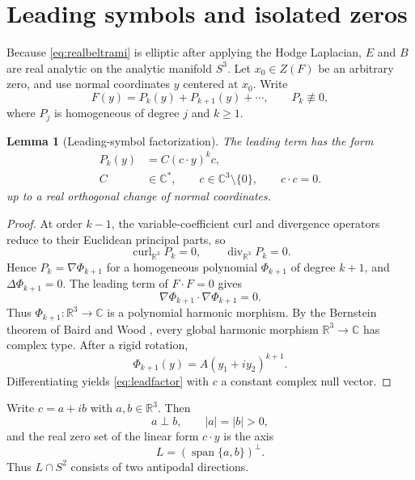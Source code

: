 \documentclass[aps,prd,reprint,nofootinbib,superscriptaddress]{revtex4-2}
\newtheorem{lemma}[theorem]{Lemma}
\theoremstyle{definition}
\theoremstyle{remark}
\newcommand{\R}{\mathbb{R}}
\newcommand{\C}{\mathbb{C}}
\newcommand{\Div}{\operatorname{div}}
\newcommand{\Curl}{\operatorname{curl}}
\newcommand{\Span}{\operatorname{span}}
\begin{document}
\section{Leading symbols and isolated zeros}

Because \eqref{eq:realbeltrami} is elliptic after applying the Hodge Laplacian, $E$ and $B$ are real analytic on the analytic manifold $S^3$. Let $x_0\in Z(F)$ be an arbitrary zero, and use normal coordinates $y$ centered at $x_0$. Write
\begin{equation}
F(y)=P_k(y)+P_{k+1}(y)+\cdots,
\qquad P_k\not\equiv0,
\label{eq:Taylor}
\end{equation}
where $P_j$ is homogeneous of degree $j$ and $k\ge1$.

\begin{lemma}[Leading-symbol factorization]
\label{lem:leading}
The leading term has the form
\begin{align}
P_k(y)&=C(c\cdot y)^k c,\nonumber\\
C&\in\C^*,\qquad c\in\C^3\setminus\{0\},\qquad c\cdot c=0.
\label{eq:leadfactor}
\end{align}
up to a real orthogonal change of normal coordinates.
\end{lemma}

\begin{proof}
At order $k-1$, the variable-coefficient curl and divergence operators reduce to their Euclidean principal parts, so
\[
\Curl_{\R^3}P_k=0,
\qquad
\Div_{\R^3}P_k=0.
\]
Hence $P_k=\nabla\Phi_{k+1}$ for a homogeneous polynomial $\Phi_{k+1}$ of degree $k+1$, and $\Delta\Phi_{k+1}=0$. The leading term of $F\cdot F=0$ gives
\[
\nabla\Phi_{k+1}\cdot\nabla\Phi_{k+1}=0.
\]
Thus $\Phi_{k+1}:\R^3\to\C$ is a polynomial harmonic morphism. By the Bernstein theorem of Baird and Wood \cite{BairdWood1988}, every global harmonic morphism $\R^3\to\C$ has complex type. After a rigid rotation,
\[
\Phi_{k+1}(y)=A(y_1+iy_2)^{k+1}.
\]
Differentiating yields \eqref{eq:leadfactor} with $c$ a constant complex null vector.
\end{proof}

Write $c=a+ib$ with $a,b\in\R^3$. Then
\begin{equation}
a\perp b,
\qquad |a|=|b|>0,
\label{eq:abnull}
\end{equation}
and the real zero set of the linear form $c\cdot y$ is the axis
\begin{equation}
L=(\Span\{a,b\})^\perp.
\label{eq:axis}
\end{equation}
Thus $L\cap S^2$ consists of two antipodal directions.
\end{document}
